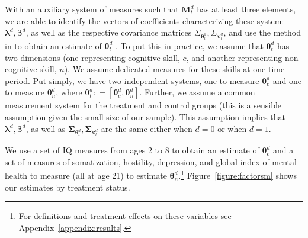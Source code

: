 With an auxiliary system of measures such that $\bm{M}_{t}^d $ has at least three elements, we are able to identify the vectors of coefficients characterizing these system: $\bm{\lambda}^d, \bm{\beta}^d$, as well as the respective covariance matrices $\Sigma_{\bm{\theta}_{t}^d}, \Sigma_{\bm{\upsilon}_{t}^d}$, and use the method in \citet{Bartlett_1938_Nature} to obtain an estimate of $\bm{\theta}_{t}^d$ \citep{Cunha_Heckman_ea_2005_oep,Cunha_Heckman_etal_2010_est_tech_cognoncog}. To put this in practice, we assume that $\bm{\theta}_{t}^d$ has two dimensions (one representing cognitive skill, $c$, and another representing non-cognitive skill, $n$). We assume dedicated measures for these skills at one time period. Put simply, we have two independent systems, one to measure $\bm{\theta}_{c}^d$ and one to measure $\bm{\theta}_{n}^d$, where $\bm{\theta}_{t}^d: = \left[ \bm{\theta}_{c}^d, \bm{\theta}_{n}^d \right]$. Further, we assume a common measurement system for the treatment and control groups (this is a sensible assumption given the small size of our sample). This assumption implies that $\bm{\lambda}^d, \bm{\beta}^d$, as well as $\bm{\Sigma}_{\bm{\theta}_{t}^d}, \bm{\Sigma}_{\bm{\upsilon}_{t}^d}$ are the same either when $d = 0$ or when $d = 1$.

We use a set of IQ measures from ages 2 to 8 to obtain an estimate of $\bm{\theta}_{c}^d$ and a set of measures of somatization, hostility, depression, and global index of mental health to measure (all at age 21) to estimate $\bm{\theta}_{n}^d$.\footnote{For definitions and treatment effects on these variables see Appendix~\ref{appendix:results}.} Figure~\ref{figure:factorsm} shows our estimates by treatment status.

